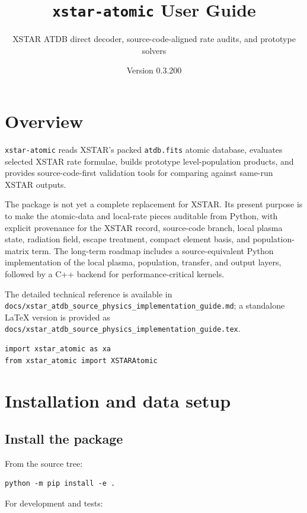\documentclass[11pt]{article}
\title{\texttt{xstar-atomic} User Guide}
\author{XSTAR ATDB direct decoder, source-code-aligned rate audits, and prototype solvers}
\date{Version 0.3.200}
\begin{document}
\maketitle
\tableofcontents
\newpage

\section{Overview}

\texttt{xstar-atomic} reads XSTAR's packed \texttt{atdb.fits} atomic database, evaluates selected XSTAR rate formulae, builds prototype level-population products, and provides source-code-first validation tools for comparing against same-run XSTAR outputs.

The package is not yet a complete replacement for XSTAR. Its present purpose is to make the atomic-data and local-rate pieces auditable from Python, with explicit provenance for the XSTAR record, source-code branch, local plasma state, radiation field, escape treatment, compact element basis, and population-matrix term. The long-term roadmap includes a source-equivalent Python implementation of the local plasma, population, transfer, and output layers, followed by a C++ backend for performance-critical kernels.

The detailed technical reference is available in \texttt{docs/xstar\_atdb\_source\_physics\_implementation\_guide.md}; a standalone LaTeX version is provided as \texttt{docs/xstar\_atdb\_source\_physics\_implementation\_guide.tex}.

\begin{lstlisting}[style=ctpython]
import xstar_atomic as xa
from xstar_atomic import XSTARAtomic
\end{lstlisting}

\section{Installation and data setup}

\subsection{Install the package}

From the source tree:

\begin{lstlisting}[style=ctterminal]
python -m pip install -e .
\end{lstlisting}

For development and tests:
\end{document}
